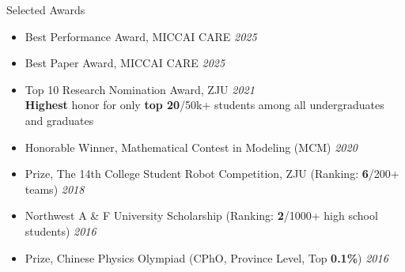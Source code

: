 \documentclass[a4paper]{resume} %
\begin{document}
\begin{rSection}{Selected Awards} 
\begin{itemize}
	\item Best Performance Award,  MICCAI CARE \hfill{\it 2025}
	\item Best Paper Award,  MICCAI CARE \hfill{\it 2025}
	\item Top 10 Research Nomination Award, ZJU \hfill{\it 2021}
	\\ {\bf Highest} honor for only {\bf top 20}/50k+ students among all undergraduates and graduates
   	\item Honorable Winner, Mathematical Contest in Modeling (MCM) \hfill{\it 2020}
 	\item {} Prize, The 14th College Student Robot Competition, ZJU (Ranking: {\bf 6}/200+ teams) \hfill{\it 2018}
 	\item Northwest A \& F University Scholarship (Ranking: {\bf 2}/1000+ high school students) \hfill{\it 2016}
 	\item {} Prize, Chinese Physics Olympiad (CPhO, Province Level, Top {\bf 0.1\%}) \hfill{\it 2016}
\end{itemize}
\end{rSection}









\end{document}
